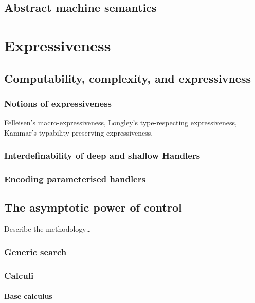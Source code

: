 \documentclass[12pt,phd,lfcs,twoside,openright,logo,leftchapter,normalheadings]{infthesis}
\theoremstyle{plain}
\theoremstyle{definition}
\begin{document}

\chapter{Abstract machine semantics}

\part{Expressiveness}
\chapter{Computability, complexity, and expressivness}
\label{ch:expressiveness}
\section{Notions of expressiveness}
Felleisen's macro-expressiveness, Longley's type-respecting
expressiveness, Kammar's typability-preserving expressiveness.

\section{Interdefinability of deep and shallow Handlers}
\section{Encoding parameterised handlers}

\chapter{The asymptotic power of control}
\label{ch:handlers-efficiency}
Describe the methodology\dots
\section{Generic search}
\section{Calculi}
\subsection{Base calculus}
\end{document}
